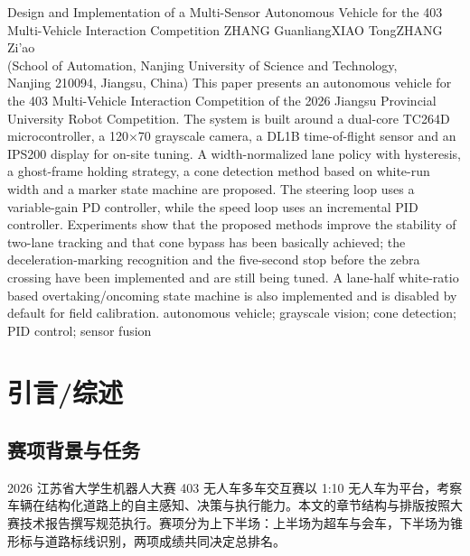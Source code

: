 \documentclass{MaiTechReport}
\begin{document}
\MaiEnglishAbstract
  {Design and Implementation of a Multi-Sensor Autonomous Vehicle for the 403 Multi-Vehicle Interaction Competition}
  {ZHANG Guanliang\quad XIAO Tong\quad ZHANG Zi'ao\\
   (School of Automation, Nanjing University of Science and Technology,\\
   Nanjing 210094, Jiangsu, China)}
  {This paper presents an autonomous vehicle for the 403 Multi-Vehicle Interaction Competition of the 2026 Jiangsu Provincial University Robot Competition. The system is built around a dual-core TC264D microcontroller, a 120$\times$70 grayscale camera, a DL1B time-of-flight sensor and an IPS200 display for on-site tuning. A width-normalized lane policy with hysteresis, a ghost-frame holding strategy, a cone detection method based on white-run width and a marker state machine are proposed. The steering loop uses a variable-gain PD controller, while the speed loop uses an incremental PID controller. Experiments show that the proposed methods improve the stability of two-lane tracking and that cone bypass has been basically achieved; the deceleration-marking recognition and the five-second stop before the zebra crossing have been implemented and are still being tuned. A lane-half white-ratio based overtaking/oncoming state machine is also implemented and is disabled by default for field calibration.}
  {autonomous vehicle; grayscale vision; cone detection; PID control; sensor fusion}

\MaiTableOfContents

\setcounter{section}{-1}

\section{引言/综述}
\label{sec:intro}

\subsection{赛项背景与任务}
2026 江苏省大学生机器人大赛 403 无人车多车交互赛以 1:10 无人车为平台，考察车辆在结构化道路上的自主感知、决策与执行能力。本文的章节结构与排版按照大赛技术报告撰写规范执行。赛项分为上下半场：上半场为超车与会车，下半场为锥形标与道路标线识别，两项成绩共同决定总排名。
\end{document}
